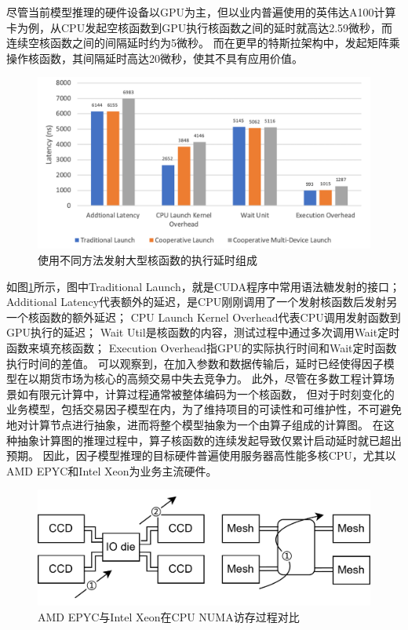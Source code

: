 尽管当前模型推理的硬件设备以GPU为主，但以业内普遍使用的英伟达A100计算卡为例，从CPU发起空核函数到GPU执行核函数之间的延时就高达2.59微秒，而连续空核函数之间的间隔延时约为5微秒。
而在更早的特斯拉架构中，发起矩阵乘操作核函数，其间隔延时高达20微秒，使其不具有应用价值。
\begin{figure}[h]
    \centering
    \includegraphics[width=1\textwidth]{image/chap02/Overhead.png}
    \caption{使用不同方法发射大型核函数的执行延时组成}
    \label{fig:kernelss}
\end{figure}
如图\ref{fig:kernelss}所示，图中Traditional Launch，就是CUDA程序中常用语法糖发射的接口；
Additional Latency代表额外的延迟，是CPU刚刚调用了一个发射核函数后发射另一个核函数的额外延迟；
CPU Launch Kernel Overhead代表CPU调用发射函数到GPU执行的延迟；
Wait Util是核函数的内容，测试过程中通过多次调用Wait定时函数来填充核函数；
Execution Overhead指GPU的实际执行时间和Wait定时函数执行时间的差值。
可以观察到，在加入参数和数据传输后，延时已经使得因子模型在以期货市场为核心的高频交易中失去竞争力。
此外，尽管在多数工程计算场景如有限元计算中，计算过程通常被整体编码为一个核函数，
但对于时刻变化的业务模型，包括交易因子模型在内，为了维持项目的可读性和可维护性，不可避免地对计算节点进行抽象，进而将整个模型抽象为一个由算子组成的计算图。
在这种抽象计算图的推理过程中，算子核函数的连续发起导致仅累计启动延时就已超出预期。
因此，因子模型推理的目标硬件普遍使用服务器高性能多核CPU，尤其以AMD EPYC和Intel Xeon为业务主流硬件。


\begin{figure}[h]
    \centering
    \includegraphics[width=1\textwidth]{image/chap02/arch.png}
    \caption{AMD EPYC与Intel Xeon在CPU NUMA访存过程对比}
    \label{fig:cpus}
\end{figure}

